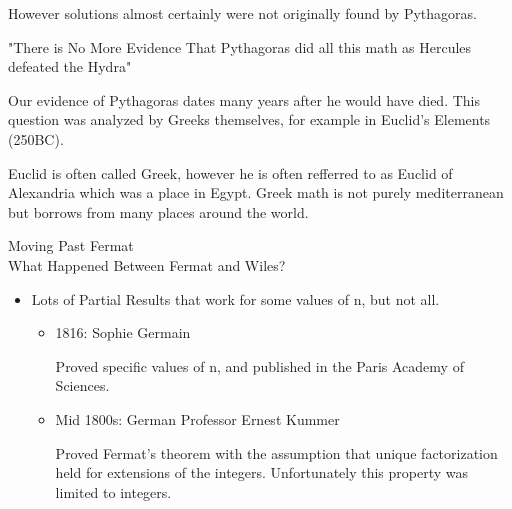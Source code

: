 \documentclass{report}
\begin{document}
\begin{description}
\begin{itemize}
\begin{mdframed}
                    However solutions almost certainly were not
                    originally found by Pythagoras.
                \end{mdframed}
                \begin{center}
                    {\huge "There is No More Evidence That Pythagoras
                    did all this math as Hercules defeated the Hydra"}
                \end{center}
                \begin{mdframed}
                    Our evidence of Pythagoras dates many years after
                    he would have died. This question was analyzed
                    by Greeks themselves, for example in Euclid's
                    Elements (250BC).
                \end{mdframed}
                \begin{mdframed}
                    Euclid is often called Greek, however he
                    is often refferred to as Euclid of Alexandria
                    which was a place in Egypt. Greek math is
                    not purely mediterranean but borrows from many
                    places around the world.
                \end{mdframed}
        \end{itemize}
        \pagebreak
    \item Moving Past Fermat\\
        {\large What Happened Between Fermat and Wiles?}
        \begin{itemize}
            \item Lots of Partial Results that work for some
                values of n, but not all.
                \begin{itemize}
                    \item 1816: Sophie Germain
                        \begin{mdframed}
                            Proved specific values of n,
                            and published in the Paris
                            Academy of Sciences.
                        \end{mdframed}
                    \item Mid 1800s: German Professor Ernest
                        Kummer
                        \begin{mdframed}
                            Proved Fermat's theorem with
                            the assumption that unique
                            factorization held for extensions
                            of the integers. Unfortunately this
                            property was limited to integers.


\end{mdframed}
\end{itemize}
\end{itemize}
\end{description}
\end{document}
